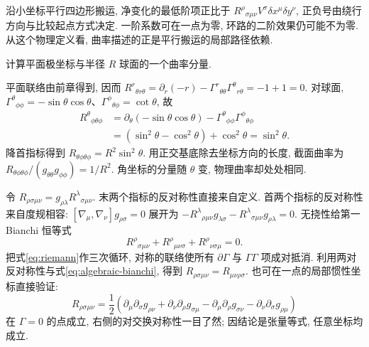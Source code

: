 沿小坐标平行四边形搬运, 净变化的最低阶项正比于 $R^\rho{}_{\sigma\mu\nu}V^\sigma\delta x^\mu\delta y^\nu$, 正负号由绕行方向与比较起点方式决定. 一阶系数可在一点为零, 环路的二阶效果仍可能不为零. 从这个物理定义看, 曲率描述的正是平行搬运的局部路径依赖.

\begin{example}
计算平面极坐标与半径 $R$ 球面的一个曲率分量.
\end{example}
\begin{solution}
平面联络由前章得到, 因而 $R^r{}_{\theta r\theta}=\partial_r(-r)-\Gamma^r{}_{\theta\theta}\Gamma^\theta{}_{r\theta}=-1+1=0$. 对球面, $\Gamma^\theta{}_{\phi\phi}=-\sin\theta\cos\theta$、$\Gamma^\phi{}_{\theta\phi}=\cot\theta$, 故
\begin{align*}
R^\theta{}_{\phi\theta\phi}
&=\partial_\theta(-\sin\theta\cos\theta)
-\Gamma^\theta{}_{\phi\phi}\Gamma^\phi{}_{\theta\phi}\\
&=(\sin^2\theta-\cos^2\theta)+\cos^2\theta=\sin^2\theta.
\end{align*}
降首指标得到 $R_{\theta\phi\theta\phi}=R^2\sin^2\theta$. 用正交基底除去坐标方向的长度, 截面曲率为 $R_{\theta\phi\theta\phi}/(g_{\theta\theta}g_{\phi\phi})=1/R^2$. 角坐标的分量随 $\theta$ 变, 物理曲率却处处相同.
\end{solution}

令 $R_{\rho\sigma\mu\nu}=g_{\rho\lambda}R^\lambda{}_{\sigma\mu\nu}$. 末两个指标的反对称性直接来自定义. 首两个指标的反对称性来自度规相容: $[\nabla_\mu,\nabla_\nu]g_{\rho\sigma}=0$ 展开为 $-R^\lambda{}_{\rho\mu\nu}g_{\lambda\sigma}-R^\lambda{}_{\sigma\mu\nu}g_{\rho\lambda}=0$. 无挠性给第一 Bianchi 恒等式
\begin{equation}\label{eq:algebraic-bianchi}
R^\rho{}_{\sigma\mu\nu}+R^\rho{}_{\mu\nu\sigma}+R^\rho{}_{\nu\sigma\mu}=0.
\end{equation}
把式\eqref{eq:riemann}作三次循环, 对称的联络使所有 $\partial\Gamma$ 与 $\Gamma\Gamma$ 项成对抵消. 利用两对反对称性与式\eqref{eq:algebraic-bianchi}, 得到 \allowbreak\mbox{$R_{\rho\sigma\mu\nu}=R_{\mu\nu\rho\sigma}$.} 也可在一点的局部惯性坐标直接验证:
\begin{equation}
R_{\rho\sigma\mu\nu}=\frac12
(\partial_\mu\partial_\sigma g_{\rho\nu}
+\partial_\nu\partial_\rho g_{\sigma\mu}
-\partial_\mu\partial_\rho g_{\sigma\nu}
-\partial_\nu\partial_\sigma g_{\rho\mu})
\end{equation}
在 $\Gamma=0$ 的点成立, 右侧的对交换对称性一目了然; 因结论是张量等式, 任意坐标均成立.

